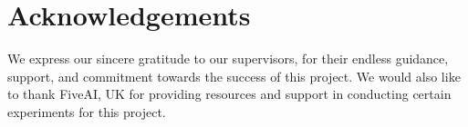 \chapter*{Acknowledgements}

\vspace{10mm}
We express our sincere gratitude to our supervisors, \supervisorA \space for their endless guidance, support, and commitment towards the success of this project. We would also like to thank FiveAI, UK for providing resources and support in conducting certain experiments for this project. 

